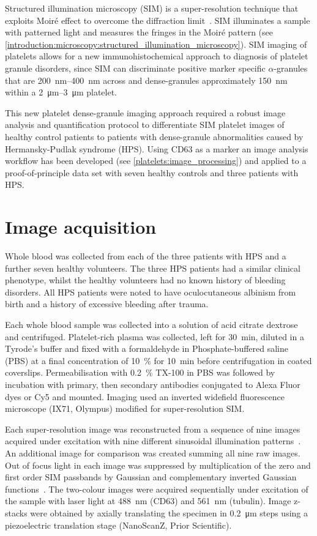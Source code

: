 Structured illumination microscopy (SIM) is a super-resolution technique that exploits Moir\'e effect to overcome the diffraction limit~\cite{Gustafsson2005}. SIM illuminates a sample with patterned light and measures the fringes in the Moir\'e pattern (see \autoref{introduction:microscopy:structured_illumination_microscopy}). SIM imaging of platelets allows for a new immunohistochemical approach to diagnosis of platelet granule disorders, since SIM can discriminate positive marker specific $\alpha$-granules that are \SIrange{200}{400}{\nano\meter} across and dense-granules approximately \SI{150}{\nano\meter} within a \SIrange{2}{3}{\micro\meter} platelet.

This new platelet dense-granule imaging approach required a robust image analysis and quantification protocol to differentiate SIM platelet images of healthy control patients to patients with dense-granule abnormalities caused by Hermansky-Pudlak syndrome (HPS). Using CD63 as a marker an image analysis workflow has been developed (see \autoref{platelets:image_processing}) and applied to a proof-of-principle data set with seven healthy controls and three patients with HPS.

\section{Image acquisition}
\label{platelets:image_acquisition}
Whole blood was collected from each of the three patients with HPS and a further seven healthy volunteers. The three HPS patients had a similar clinical phenotype, whilst the healthy volunteers had no known history of bleeding disorders. All HPS patients were noted to have oculocutaneous albinism from birth and a history of excessive bleeding after trauma.

Each whole blood sample was collected into a solution of acid citrate dextrose and centrifuged. Platelet-rich plasma was collected, left for \SI{30}{\minute}, diluted in a Tyrode’s buffer and fixed with a formaldehyde in Phosphate-buffered saline (PBS) at a final concentration of \SI{10}{\percent} for \SI{10}{\minute} before centrifugation in coated coverslips. Permeabilisation with \SI{0.2}{\percent} TX-100 in PBS was followed by incubation with primary, then secondary antibodies conjugated to Alexa Fluor dyes or Cy5 and mounted. Imaging used an inverted widefield fluorescence microscope (IX71, Olympus) modified for super-resolution SIM.

Each super-resolution image was reconstructed from a sequence of nine images acquired under excitation with nine different sinusoidal illumination patterns~\cite{Gustafsson2008}. An additional image for comparison was created summing all nine raw images. Out of focus light in each image was suppressed by multiplication of the zero and first order SIM passbands by Gaussian and complementary inverted Gaussian functions~\cite{Holleran2014}. The two-colour images were acquired sequentially under excitation of the sample with laser light at \SI{488}{\nano\meter} (CD63) and \SI{561}{\nano\meter} (tubulin). Image z-stacks were obtained by axially translating the specimen in \SI{0.2}{\micro\meter} steps using a piezoelectric translation stage (NanoScanZ, Prior Scientific).

